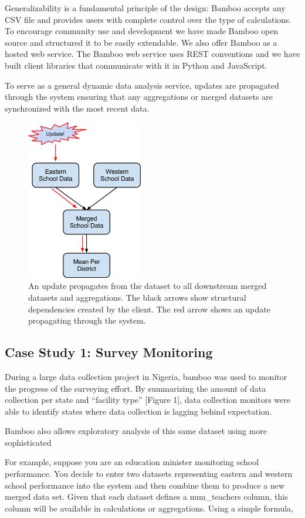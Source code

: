\documentclass{acm_proc_article-sp}
\begin{document}
Generalizability is a fundamental principle of the design: Bamboo accepts any CSV file and provides users with complete control over the type of calculations.  To encourage community use and development we have made Bamboo open source and structured it to be easily extendable.  We also offer Bamboo as a hosted web service.  The Bamboo web service uses REST conventions and we have built client libraries that communicate with it in Python and JavaScript.

To serve as a general dynamic data analysis service, updates are propagated through the system ensuring that any aggregations or merged datasets are synchronized with the most recent data.

\begin{figure}
\centering
\includegraphics[width=2in]{figures/update_flow}
\caption{An update propagates from the dataset to all downstream merged datasets and aggregations.  The black arrows show structural dependencies created by the client.  The red arrow shows an update propagating through the system.}
\end{figure}

\subsection{Case Study 1: Survey Monitoring}

During a large data collection project in Nigeria, bamboo was used to monitor the progress of the surveying effort. By summarizing the amount of data collection per state and “facility type” [Figure 1], data collection monitors were able to identify states where data collection is lagging behind expectation.


Bamboo also allows exploratory analysis of this same dataset using more sophisticated 

For example, suppose you are an education minister monitoring school performance.  You decide to enter two datasets representing eastern and western school performance into the system and then combine them to produce a new merged data set.  Given that each dataset defines a num\_teachers column, this column will be available in calculations or aggregations.  Using a simple formula,
\end{document}
